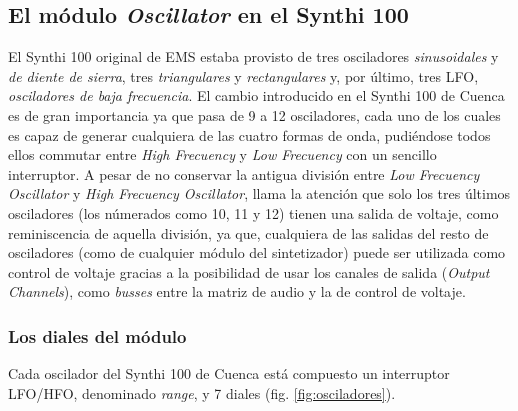 \subsection{El módulo \textit{Oscillator} en el Synthi 100}

El Synthi 100 original de EMS estaba provisto de tres osciladores \textit{sinusoidales} y \textit{de diente de sierra}, tres \textit{triangulares} y \textit{rectangulares} y, por último, tres LFO, \textit{osciladores de baja frecuencia}. El cambio introducido en el Synthi 100 de Cuenca es de gran importancia ya que pasa de 9 a 12 osciladores, cada uno de los cuales es capaz de generar cualquiera de las cuatro formas de onda, pudiéndose todos ellos commutar entre \textit{High Frecuency} y \textit{Low Frecuency} con un sencillo interruptor. A pesar de no conservar la antigua división entre \textit{Low Frecuency Oscillator} y \textit{High Frecuency Oscillator}, llama la atención que solo los tres últimos osciladores (los númerados como 10, 11 y 12) tienen una salida de voltaje, como reminiscencia de aquella división, ya que, cualquiera de las salidas del resto de osciladores (como de cualquier módulo del sintetizador) puede ser utilizada como control de voltaje gracias a la posibilidad de usar los canales de salida (\textit{Output Channels}), como \textit{busses} entre la matriz de audio y la de control de voltaje.



\subsubsection{Los diales del módulo}

Cada oscilador del Synthi 100 de Cuenca está compuesto un interruptor LFO/HFO, denominado \textit{range}, y 7 diales (fig. \ref{fig:osciladores}).


